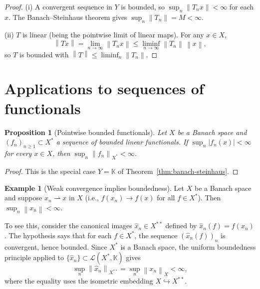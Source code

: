 \documentclass[a4paper,12pt]{book}
\newcommand{\K}{\mathbb{K}}
\newcommand{\norm}[1]{\left\| #1 \right\|}
\newcommand{\abs}[1]{\left| #1 \right|}
\newcommand{\weakto}{\rightharpoonup}
\theoremstyle{definition}
\newtheorem{example}[definition]{Example}
\theoremstyle{plain}
\newtheorem{proposition}[definition]{Proposition}
\theoremstyle{remark}
\begin{document}
\begin{proof}
(i) A convergent sequence in $Y$ is bounded, so $\sup_n \norm{T_n x} < \infty$
for each $x$. The Banach--Steinhaus theorem gives $\sup_n \norm{T_n} = M < \infty$.

(ii) $T$ is linear (being the pointwise limit of linear maps). For any $x \in X$,
\[
  \norm{Tx} = \lim_{n\to\infty} \norm{T_n x}
  \leq \liminf_{n\to\infty} \norm{T_n}\, \norm{x},
\]
so $T$ is bounded with $\norm{T} \leq \liminf_n \norm{T_n}$.
\end{proof}

\section{Applications to sequences of functionals}\label{sec:ubp-functionals}

\begin{proposition}[Pointwise bounded functionals]\label{prop:ptwise-bounded-functionals}
Let $X$ be a Banach space and $(f_n)_{n \geq 1} \subset X^*$ a sequence of bounded
linear functionals. If $\sup_n \abs{f_n(x)} < \infty$ for every $x \in X$, then
$\sup_n \norm{f_n}_{X^*} < \infty$.
\end{proposition}

\begin{proof}
This is the special case $Y = \K$ of Theorem~\ref{thm:banach-steinhaus}.
\end{proof}

\begin{example}[Weak convergence implies boundedness]\label{ex:weak-conv-bounded}
Let $X$ be a Banach space and suppose $x_n \weakto x$ in $X$ (i.e.,
$f(x_n) \to f(x)$ for all $f \in X^*$). Then $\sup_n \norm{x_n} < \infty$.

To see this, consider the canonical images $\hat{x}_n \in X^{**}$ defined by
$\hat{x}_n(f) = f(x_n)$. The hypothesis says that for each $f \in X^*$, the sequence
$(\hat{x}_n(f))_n$ is convergent, hence bounded. Since $X^*$ is a Banach space,
the uniform boundedness principle applied to $\{\hat{x}_n\} \subset
\mathcal{L}(X^*, \K)$ gives
\[
  \sup_n \norm{\hat{x}_n}_{X^{**}} = \sup_n \norm{x_n}_X < \infty,
\]
where the equality uses the isometric embedding $X \hookrightarrow X^{**}$.
\end{example}
\end{document}
